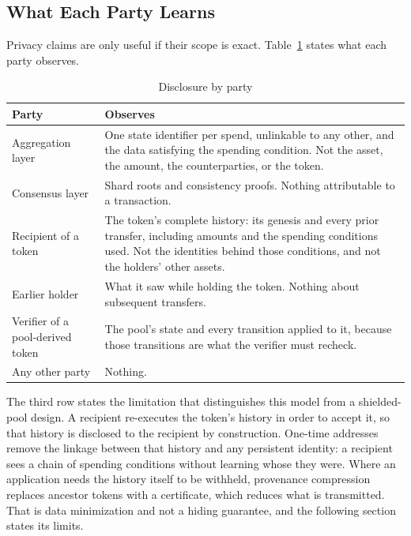 \subsection{What Each Party Learns}

Privacy claims are only useful if their scope is exact. Table~\ref{tab:disclosure} states what each party observes.

\begin{table}[ht]
    \centering
    \caption{Disclosure by party}
    \label{tab:disclosure}
    \small
    \begin{tabular}{@{}p{4.3cm}p{9.6cm}@{}}
        \toprule
        \textbf{Party} & \textbf{Observes} \\
        \midrule
        Aggregation layer & One state identifier per spend, unlinkable to any other, and the data satisfying the spending condition. Not the asset, the amount, the counterparties, or the token. \\
        \addlinespace
        Consensus layer & Shard roots and consistency proofs. Nothing attributable to a transaction. \\
        \addlinespace
        Recipient of a token & The token's complete history: its genesis and every prior transfer, including amounts and the spending conditions used. Not the identities behind those conditions, and not the holders' other assets. \\
        \addlinespace
        Earlier holder & What it saw while holding the token. Nothing about subsequent transfers. \\
        \addlinespace
        Verifier of a pool-derived token & The pool's state and every transition applied to it, because those transitions are what the verifier must recheck. \\
        \addlinespace
        Any other party & Nothing. \\
        \bottomrule
    \end{tabular}
\end{table}

The third row states the limitation that distinguishes this model from a shielded-pool design. A recipient re-executes the token's history in order to accept it, so that history is disclosed to the recipient by construction. One-time addresses remove the linkage between that history and any persistent identity: a recipient sees a chain of spending conditions without learning whose they were. Where an application needs the history itself to be withheld, provenance compression replaces ancestor tokens with a certificate, which reduces what is transmitted. That is data minimization and not a hiding guarantee, and the following section states its limits.

